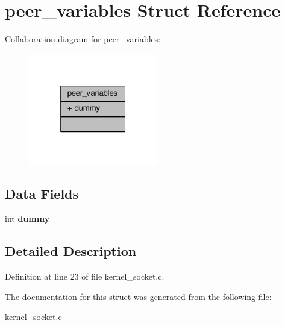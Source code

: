 \hypertarget{structpeer__variables}{}\section{peer\+\_\+variables Struct Reference}
\label{structpeer__variables}


Collaboration diagram for peer\+\_\+variables\+:\nopagebreak
\begin{figure}[H]
\begin{center}
\leavevmode
\includegraphics[width=160pt]{structpeer__variables__coll__graph}
\end{center}
\end{figure}
\subsection*{Data Fields}
\begin{DoxyCompactItemize}
\item 
int {\bfseries dummy}\hypertarget{structpeer__variables_a55ff961c263956f40e65d05756672709}{}\label{structpeer__variables_a55ff961c263956f40e65d05756672709}

\end{DoxyCompactItemize}


\subsection{Detailed Description}


Definition at line 23 of file kernel\+\_\+socket.\+c.



The documentation for this struct was generated from the following file\+:\begin{DoxyCompactItemize}
\item 
kernel\+\_\+socket.\+c\end{DoxyCompactItemize}
